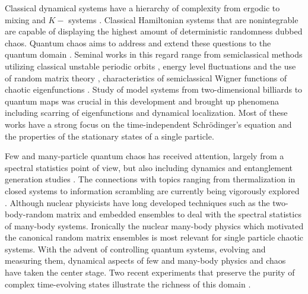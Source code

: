 \documentclass[pre,aps,showpacs,showkeys,twocolumn]{revtex4-1}
\theoremstyle{definition}
\theoremstyle{remark}
\begin{document}
Classical dynamical systems have a hierarchy of complexity from ergodic to mixing and $K-$ systems \cite{arnol1968ergodic}. Classical Hamiltonian systems that are nonintegrable are capable of displaying the highest amount of deterministic randomness dubbed chaos. Quantum chaos aims to address and extend these questions to the quantum domain \cite{Gutzwiller90, Haake}. Seminal works in this regard range from semiclassical methods utilizing classical unstable periodic orbits \cite{gutzwiller1971periodic}, energy level fluctuations and the use of random matrix theory \cite{Berry375, bohigas1984, robnik1985classical}, characteristics of semiclassical Wigner functions of chaotic eigenfunctions \cite{Berry77a, voros1976semi}. Study of model systems from two-dimensional billiards \cite{McDonald, heller1984bound} to quantum maps \cite{BERRY197926} was crucial in this development and  brought up phenomena including scarring of eigenfunctions and dynamical localization. Most of these works have a strong focus on the time-independent Schr{\"o}dinger's equation and the properties of the stationary states of a single particle. 

Few and many-particle quantum chaos has received attention, largely from a spectral statistics point of view, but also including dynamics and entanglement generation studies \cite{aberg1990onset, montambaux1993quantum, hsu1993level, van1994two, kudo2003unexpected, rabson2004crossover,jacquod1997emergence, georgeot1998integrability, LakSub2003, avishai2002level, santos2004integrability, kudo2004level, LakSub2005, KarthikSharmaLak2007}. The connections with topics ranging from thermalization in closed systems to information scrambling are currently being vigorously explored \cite{Rigol2016, MaldacenaSYK15}. Although nuclear physicists have long developed techniques such as the two-body-random matrix and embedded ensembles \cite{bohigas1971spacing,Kota} to deal with the spectral statistics of many-body systems. Ironically the nuclear many-body physics which motivated the canonical random matrix ensembles \cite{mehta2004random} is most relevant for single particle chaotic systems. With the advent of controlling quantum systems, evolving and measuring them, dynamical aspects of few and many-body physics and chaos have taken the center stage. Two recent experiments that preserve the purity of complex time-evolving states illustrate the richness of this domain \cite{Neill16, kaufman2016quantum}.
\end{document}
